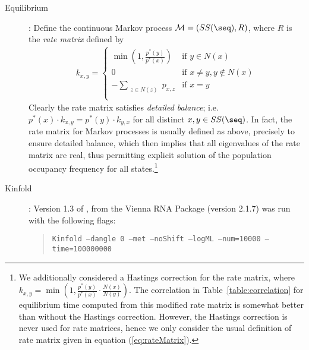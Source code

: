 \begin{description}
\item[Equilibrium]: Define the continuous Markov process
$\mathcal{M}=(SS(\seq),R)$, where $R$ is the {\em rate matrix} defined
by
\begin{eqnarray}
\label{eq:rateMatrix} k_{x,y} = \left\{
\begin{array}{ll}

\min(1, \frac{p^*(y)}{p^*(x)} ) &\mbox{if $y \in N(x)$}\\
0 &\mbox{if $x \ne y, y \not\in N(x)$}\\
- \sum_{\substack{z \in N(z)}} p_{x,z} &\mbox{if $x=y$}\\
\end{array}
\right.
\end{eqnarray}
Clearly the rate matrix satisfies {\em detailed balance}; i.e. $p^*(x)
\cdot k_{x,y} = p^*(y) \cdot k_{y,x}$ for all distinct $x,y \in
SS(\seq)$. In fact, the rate matrix for Markov processes is usually
defined as above, precisely to ensure detailed balance, which then
implies that all eigenvalues of the rate matrix are real, thus
permitting explicit solution of the population occupancy frequency for
all states.\footnote{We additionally considered a Hastings correction
for the rate matrix, where $k_{x,y} = \min(1, \frac{p^*(y)}{p^*(x)}
\cdot \frac{N(x)}{N(y)})$. The correlation in
Table~\ref{table:correlation} for equilibrium time computed from this
modified rate matrix is somewhat better than without the Hastings
correction. However, the Hastings correction is never used for rate
matrices, hence we only consider the usual definition of rate matrix
given in equation (\ref{eq:rateMatrix}).}

\item[Kinfold]: Version 1.3 of \kinfold \cite{Flamm:00a}, from
the Vienna RNA Package (version 2.1.7) was run with the following
flags:
\begin{quote}
{\tt Kinfold --dangle 0 --met --noShift --logML --num=10000
--time=100000000}


\end{quote}
\end{description}

